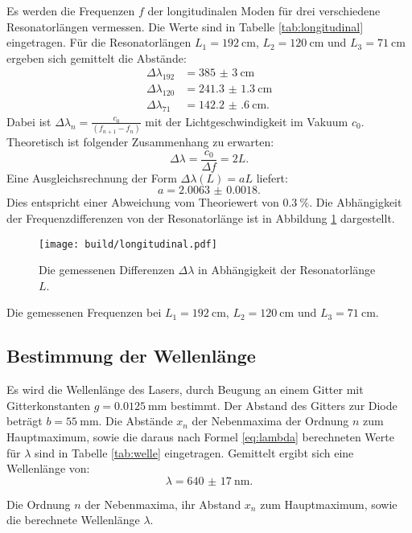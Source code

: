 Es werden die Frequenzen $f$ der longitudinalen Moden für drei verschiedene Resonatorlängen vermessen. Die Werte sind in Tabelle \ref{tab:longitudinal} eingetragen.
Für die Resonatorlängen $L_1=\SI{192}{\centi\metre}$, $L_2=\SI{120}{\centi\metre}$ und $L_3=\SI{71}{\centi\metre}$ ergeben sich gemittelt die Abstände:
\begin{align*}
\Delta\lambda_{192} &= \SI{385(3)}{\centi\metre}\\
\Delta\lambda_{120} &= \SI{241.3(13)}{\centi\metre}\\
\Delta\lambda_{71} &= \SI{142.2(6)}{\centi\metre}\text{.}
\end{align*}
Dabei ist $\Delta\lambda_n = \frac{c_0}{(f_{n+1}-f_n)}$ mit der Lichtgeschwindigkeit im Vakuum $c_0$.
Theoretisch ist folgender Zusammenhang zu erwarten:
\[
\Delta\lambda = \frac{c_0}{\Delta f} = 2L \text{.}
\]
Eine Ausgleichsrechnung der Form $\Delta\lambda(L) = aL$ liefert:
\[
a = \num{2.0063(18)}\text{.}
\]
Dies entspricht einer Abweichung vom Theoriewert von $\SI{0.3}{\%}$.
Die Abhängigkeit der Frequenzdifferenzen von der Resonatorlänge ist in Abbildung \ref{fig:longitudinal} dargestellt.

\begin{figure}
	\centering
	\texttt{[image: build/longitudinal.pdf]}
	\caption{Die gemessenen Differenzen $\Delta\lambda$ in Abhängigkeit der Resonatorlänge $L$.}
	\label{fig:longitudinal}
\end{figure}

\begin{table}
	\centering
	\caption{Die gemessenen Frequenzen bei $L_1=\SI{192}{\centi\metre}$, $L_2=\SI{120}{\centi\metre}$ und $L_3=\SI{71}{\centi\metre}$.}
	
	\label{tab:longitudinal}
\end{table}

\subsection{Bestimmung der Wellenlänge}

Es wird die Wellenlänge des Lasers, durch Beugung an einem Gitter mit Gitterkonstanten $g=\SI{0.0125}{\milli\metre}$ bestimmt. Der Abstand des Gitters zur Diode beträgt $b=\SI{55}{\milli\metre}$. Die Abstände $x_n$ der Nebenmaxima der Ordnung $n$ zum Hauptmaximum, sowie die daraus nach Formel \eqref{eq:lambda} berechneten Werte für $\lambda$ sind in Tabelle \ref{tab:welle} eingetragen.
Gemittelt ergibt sich eine Wellenlänge von:
\[
\lambda = \SI{640(17)}{\nano\metre} \text{.}
\] 

\begin{table}
	\centering
	\caption{Die Ordnung $n$ der Nebenmaxima, ihr Abstand $x_n$ zum Hauptmaximum, sowie die berechnete Wellenlänge $\lambda$.}
	
	\label{tab:welle}
\end{table}